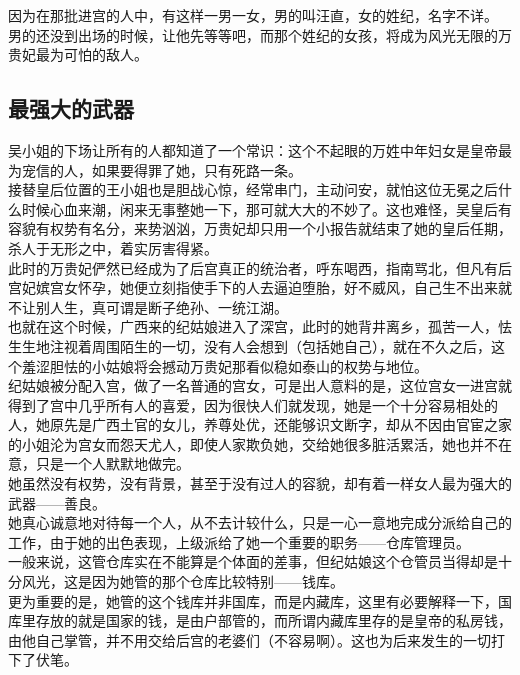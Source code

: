 \begin{multicols}{\theparacolNo}
因为在那批进宫的人中，有这样一男一女，男的叫汪直，女的姓纪，名字不详。\\

男的还没到出场的时候，让他先等等吧，而那个姓纪的女孩，将成为风光无限的万贵妃最为可怕的敌人。\\

\subsection{最强大的武器}
吴小姐的下场让所有的人都知道了一个常识：这个不起眼的万姓中年妇女是皇帝最为宠信的人，如果要得罪了她，只有死路一条。\\

接替皇后位置的王小姐也是胆战心惊，经常串门，主动问安，就怕这位无冕之后什么时候心血来潮，闲来无事整她一下，那可就大大的不妙了。这也难怪，吴皇后有容貌有权势有名分，来势汹汹，万贵妃却只用一个小报告就结束了她的皇后任期，杀人于无形之中，着实厉害得紧。\\

此时的万贵妃俨然已经成为了后宫真正的统治者，呼东喝西，指南骂北，但凡有后宫妃嫔宫女怀孕，她便立刻指使手下的人去逼迫堕胎，好不威风，自己生不出来就不让别人生，真可谓是断子绝孙、一统江湖。\\

也就在这个时候，广西来的纪姑娘进入了深宫，此时的她背井离乡，孤苦一人，怯生生地注视着周围陌生的一切，没有人会想到（包括她自己），就在不久之后，这个羞涩胆怯的小姑娘将会撼动万贵妃那看似稳如泰山的权势与地位。\\

纪姑娘被分配入宫，做了一名普通的宫女，可是出人意料的是，这位宫女一进宫就得到了宫中几乎所有人的喜爱，因为很快人们就发现，她是一个十分容易相处的人，她原先是广西土官的女儿，养尊处优，还能够识文断字，却从不因由官宦之家的小姐沦为宫女而怨天尤人，即使人家欺负她，交给她很多脏活累活，她也并不在意，只是一个人默默地做完。\\

她虽然没有权势，没有背景，甚至于没有过人的容貌，却有着一样女人最为强大的武器——善良。\\

她真心诚意地对待每一个人，从不去计较什么，只是一心一意地完成分派给自己的工作，由于她的出色表现，上级派给了她一个重要的职务——仓库管理员。\\

一般来说，这管仓库实在不能算是个体面的差事，但纪姑娘这个仓管员当得却是十分风光，这是因为她管的那个仓库比较特别——钱库。\\

更为重要的是，她管的这个钱库并非国库，而是内藏库，这里有必要解释一下，国库里存放的就是国家的钱，是由户部管的，而所谓内藏库里存的是皇帝的私房钱，由他自己掌管，并不用交给后宫的老婆们（不容易啊）。这也为后来发生的一切打下了伏笔。\\


\end{multicols}
